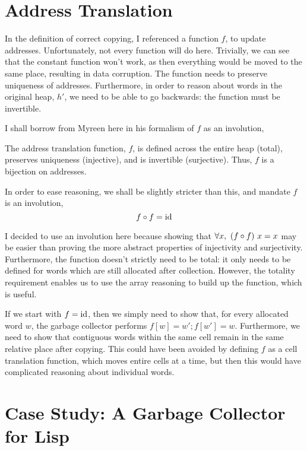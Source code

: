 \section{Address Translation}
\label{sec:copying-address}

In the definition of correct \gls{copying}, I referenced a function
$f$, to update addresses. Unfortunately, not every function will do
here. Trivially, we can see that the constant function won't work, as
then everything would be moved to the same place, resulting in data
corruption. The function needs to preserve uniqueness of
addresses. Furthermore, in order to reason about words in the original
\gls{heap}, $h'$, we need to be able to go backwards: the function
must be invertible.

I shall borrow from Myreen\cite{Myreen10} here in his formalism of $f$
as an involution,

\begin{definition}
  \label{def:c-address-translation-function}
  The address translation function, $f$, is defined across the entire
  heap (total), preserves uniqueness (injective), and is invertible
  (surjective). Thus, $f$ is a bijection on addresses.

  In order to ease reasoning, we shall be slightly stricter than this,
  and mandate $f$ is an involution, \[f \circ f = \mathrm{id}\]
\end{definition}

I decided to use an involution here because showing that $\forall x,\
(f \circ f)~x = x$ may be easier than proving the more abstract
properties of injectivity and surjectivity. Furthermore, the function
doesn't strictly need to be total: it only needs to be defined for
words which are still allocated after collection. However, the
totality requirement enables us to use the array reasoning to build up
the function, which is useful.

If we start with $f = \mathrm{id}$, then we simply need to show that, for
every allocated word $w$, the \gls{garbage collector} performs $f[w] =
w'; f[w'] = w$. Furthermore, we need to show that contiguous words
within the same \gls{cell} remain in the same relative place after
copying. This could have been avoided by defining $f$ as a cell
translation function, which moves entire cells at a time, but then
this would have complicated reasoning about individual words.

\section{Case Study: A Garbage Collector for Lisp}
\label{sec:copying-example}

